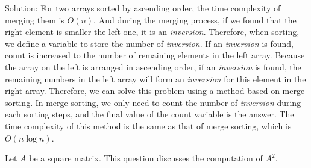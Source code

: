\documentclass{oxmathproblems}
\begin{document}
\begin{questions}
Solution:
For two arrays sorted by ascending order, the time complexity of merging them is $O(n)$. And during the merging process, if we found that the right element is smaller the left one, it is an \emph{inversion}. Therefore, when sorting, we define a variable to store the number of \emph{inversion}. If an \emph{inversion} is found, count is increased to the number of remaining elements in the left array. Because the array on the left is arranged in ascending order, if an \emph{inversion} is found, the remaining numbers in the left array will form an \emph{inversion} for this element in the right array.\newline
Therefore, we can solve this problem using a method based on merge sorting. In merge sorting, we only need to count the number of \emph{inversion} during each sorting steps, and the final value of the count variable is the answer. The time complexity of this method is the same as that of merge sorting, which is $O(n\log n)$.

\miquestion[25]
Let $A$ be a square matrix. This question discusses the computation of $A^2$.
\end{questions}
\end{document}
